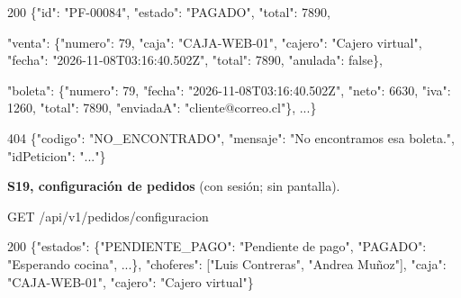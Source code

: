 \begin{codigo}
200 \{"id":\allowbreak{} "PF-\allowbreak{}00084",\allowbreak{} "estado":\allowbreak{} "PAGADO",\allowbreak{} "total":\allowbreak{} 7890,\allowbreak{}\par
\hspace*{5\ttw}"venta":\allowbreak{} \{"numero":\allowbreak{} 79,\allowbreak{} "caja":\allowbreak{} "CAJA-\allowbreak{}WEB-\allowbreak{}01",\allowbreak{} "cajero":\allowbreak{} "Cajero virtual",\allowbreak{} "fecha":\allowbreak{} "2026-\allowbreak{}11-\allowbreak{}08T03:\allowbreak{}16:\allowbreak{}40.\allowbreak{}502Z",\allowbreak{} "total":\allowbreak{} 7890,\allowbreak{} "anulada":\allowbreak{} false\},\allowbreak{}\par
\hspace*{5\ttw}"boleta":\allowbreak{} \{"numero":\allowbreak{} 79,\allowbreak{} "fecha":\allowbreak{} "2026-\allowbreak{}11-\allowbreak{}08T03:\allowbreak{}16:\allowbreak{}40.\allowbreak{}502Z",\allowbreak{} "neto":\allowbreak{} 6630,\allowbreak{} "iva":\allowbreak{} 1260,\allowbreak{} "total":\allowbreak{} 7890,\allowbreak{} "enviadaA":\allowbreak{} "cliente@correo.\allowbreak{}cl"\},\allowbreak{} .\allowbreak{}.\allowbreak{}.\allowbreak{}\}\par
404 \{"codigo":\allowbreak{} "NO\_\allowbreak{}ENCONTRADO",\allowbreak{} "mensaje":\allowbreak{} "No encontramos esa boleta.\allowbreak{}",\allowbreak{} "idPeticion":\allowbreak{} ".\allowbreak{}.\allowbreak{}.\allowbreak{}"\}\par
\end{codigo}

\textbf{S19, configuración de pedidos} (con sesión; sin pantalla).


\begin{codigo}
GET /\allowbreak{}api/\allowbreak{}v1/\allowbreak{}pedidos/\allowbreak{}configuracion\par
\end{codigo}

\begin{codigo}
200 \{"estados":\allowbreak{} \{"PENDIENTE\_\allowbreak{}PAGO":\allowbreak{} "Pendiente de pago",\allowbreak{} "PAGADO":\allowbreak{} "Esperando cocina",\allowbreak{} .\allowbreak{}.\allowbreak{}.\allowbreak{}\},\allowbreak{} "choferes":\allowbreak{} [\allowbreak{}"Luis Contreras",\allowbreak{} "Andrea Muñoz"],\allowbreak{} "caja":\allowbreak{} "CAJA-\allowbreak{}WEB-\allowbreak{}01",\allowbreak{} "cajero":\allowbreak{} "Cajero virtual"\}\par
\end{codigo}

